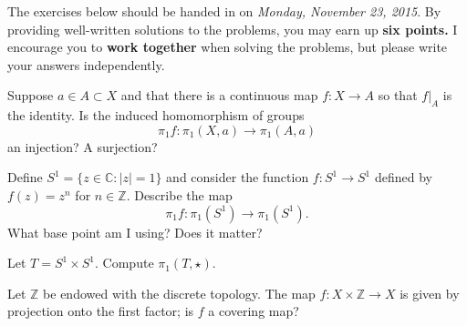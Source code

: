 \documentclass[12pt]{pset}
\author{Jim Fowler}
\date{Autumn 2015}
\newcommand{\ZZ}{\mathbb{Z}}
\begin{document}
\maketitle

\noindent The exercises below should be handed in on \textit{Monday,
  November 23, 2015}.  By providing well-written solutions to the
problems, you may earn up \textbf{six points.}  I encourage you to
\textbf{work together} when solving the problems, but please write
your answers independently.

\begin{problem}

  Suppose $a \in A \subset X$ and that there is a continuous map
  $f : X \to A$ so that $f |_{A}$ is the identity.  Is the induced homomorphism of groups
  \[
  \pi_1 f : \pi_1(X,a) \to \pi_1(A,a)\]
  an injection?  A surjection?

\end{problem}

\begin{problem}

  Define $S^1 = \{ z \in \mathbb{C} : |z| = 1\}$ and consider the
  function $f : S^1 \to S^1$ defined by $f(z) = z^n$ for
  $n \in \mathbb{Z}$.  Describe the map
  \[
  \pi_1 f : \pi_1(S^1) \to \pi_1(S^1).
  \]
  What base point am I using?  Does it matter?

\end{problem}

\clearpage

\begin{problem}

  Let $T = S^1 \times S^1$.  Compute $\pi_1(T,\star)$.

\end{problem}

\begin{problem}

  Let $\ZZ$ be endowed with the discrete topology.  The map
  $f : X \times \ZZ \to X$ is given by projection onto the first
  factor; is $f$ a covering map?

\end{problem}
\end{document}
